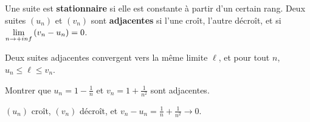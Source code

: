 \begin{definition}
Une suite est \textbf{stationnaire} si elle est constante à partir d'un
certain rang. Deux suites $(u_{n})$ et $(v_{n})$ sont \textbf{adjacentes} si
l'une croît, l'autre décroît, et si $\limn\left(v_{n}-u_{n}\right) = 0$.
\end{definition}

\begin{theoreme}
Deux suites adjacentes convergent vers la même limite $\ell$, et pour tout
$n$, $u_{n} \leq \ell \leq v_{n}$.
\end{theoreme}

\begin{entrainement}
\exo[\niveau{2}] Montrer que $u_{n} = 1-\frac1n$ et $v_{n} = 1+\frac{1}{n^{2}}$
sont adjacentes.
\end{entrainement}

\begin{corrige}
$(u_{n})$ croît, $(v_{n})$ décroît, et $v_{n}-u_{n} = \frac1n+\frac{1}{n^{2}} \to 0$.
\end{corrige}

